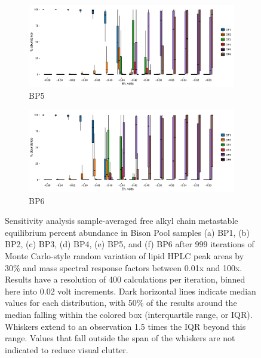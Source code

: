 \singlespace
\begin{figure}[h]\ContinuedFloat

    \begin{subfigure}[b]{\linewidth}
    	\includegraphics[width=\linewidth]{"figs_ch2/boxplot_ggplot_02bin Bison OF5 iter 999"}
    	\caption{BP5}
        \label{fig:BP5_mc}
    \end{subfigure}
    \begin{subfigure}[b]{\linewidth}
    	\includegraphics[width=\linewidth]{"figs_ch2/boxplot_ggplot_02bin Bison OF6 iter 999"}
    	\caption{BP6}
        \label{fig:BP6_mc}
    \end{subfigure}
    
    \caption[Sensitivity analysis sample-averaged free alkyl chain metastable equilibrium percent abundance in Bison Pool samples]{Sensitivity analysis sample-averaged free alkyl chain metastable equilibrium percent abundance in Bison Pool samples (a) BP1, (b) BP2, (c) BP3, (d) BP4, (e) BP5, and (f) BP6 after 999 iterations of Monte Carlo-style random variation of lipid HPLC peak areas by 30\% and mass spectral response factors between 0.01x and 100x. Results have a resolution of 400 calculations per iteration, binned here into 0.02 volt increments. Dark horizontal lines indicate median values for each distribution, with 50\% of the results around the median falling within the colored box (interquartile range, or IQR). Whiskers extend to an observation 1.5 times the IQR beyond this range. Values that fall outside the span of the whiskers are not indicated to reduce visual clutter.}
    \label{fig:bison_mc}
\end{figure}
\doublespace


